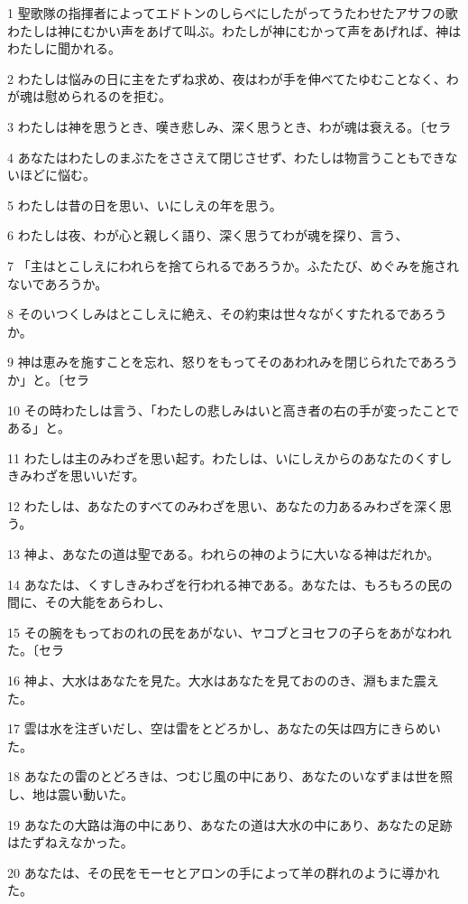 \par 1 聖歌隊の指揮者によってエドトンのしらべにしたがってうたわせたアサフの歌 わたしは神にむかい声をあげて叫ぶ。わたしが神にむかって声をあげれば、神はわたしに聞かれる。
\par 2 わたしは悩みの日に主をたずね求め、夜はわが手を伸べてたゆむことなく、わが魂は慰められるのを拒む。
\par 3 わたしは神を思うとき、嘆き悲しみ、深く思うとき、わが魂は衰える。〔セラ
\par 4 あなたはわたしのまぶたをささえて閉じさせず、わたしは物言うこともできないほどに悩む。
\par 5 わたしは昔の日を思い、いにしえの年を思う。
\par 6 わたしは夜、わが心と親しく語り、深く思うてわが魂を探り、言う、
\par 7 「主はとこしえにわれらを捨てられるであろうか。ふたたび、めぐみを施されないであろうか。
\par 8 そのいつくしみはとこしえに絶え、その約束は世々ながくすたれるであろうか。
\par 9 神は恵みを施すことを忘れ、怒りをもってそのあわれみを閉じられたであろうか」と。〔セラ
\par 10 その時わたしは言う、「わたしの悲しみはいと高き者の右の手が変ったことである」と。
\par 11 わたしは主のみわざを思い起す。わたしは、いにしえからのあなたのくすしきみわざを思いいだす。
\par 12 わたしは、あなたのすべてのみわざを思い、あなたの力あるみわざを深く思う。
\par 13 神よ、あなたの道は聖である。われらの神のように大いなる神はだれか。
\par 14 あなたは、くすしきみわざを行われる神である。あなたは、もろもろの民の間に、その大能をあらわし、
\par 15 その腕をもっておのれの民をあがない、ヤコブとヨセフの子らをあがなわれた。〔セラ
\par 16 神よ、大水はあなたを見た。大水はあなたを見ておののき、淵もまた震えた。
\par 17 雲は水を注ぎいだし、空は雷をとどろかし、あなたの矢は四方にきらめいた。
\par 18 あなたの雷のとどろきは、つむじ風の中にあり、あなたのいなずまは世を照し、地は震い動いた。
\par 19 あなたの大路は海の中にあり、あなたの道は大水の中にあり、あなたの足跡はたずねえなかった。
\par 20 あなたは、その民をモーセとアロンの手によって羊の群れのように導かれた。

